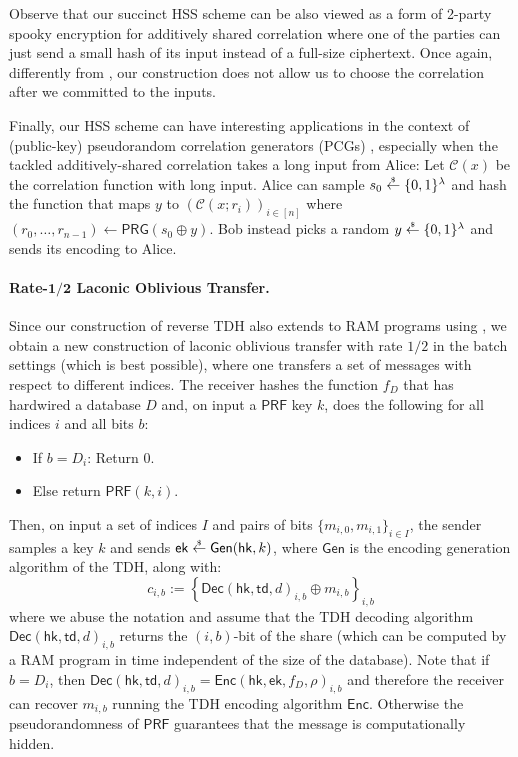 \documentclass{article}
\newcommand{\ek}{\mathsf{ek}}
\newcommand{\td}{\mathsf{td}}
\newcommand{\getsr}{\overset{\raisebox{-1pt}{$\scriptscriptstyle \$$}}{\gets}}
\newcommand{\sample}{\getsr}
\renewcommand{\sec}{\ensuremath{\lambda}}
\newcommand{\algofont}[1]{\ensuremath{\mathsf{#1}}}
\newcommand{\Enc}{{\algofont{Enc}}}
\newcommand{\Dec}{{\algofont{Dec}}}
\newcommand{\Gen}{{\algofont{Gen}}}
\newcommand{\hk}{\ensuremath{\mathsf{hk}}}
\begin{document}
Observe that our succinct HSS scheme can be also viewed as a form of 2-party spooky encryption for additively shared correlation \cite{C:DHRW16} where one of the parties can just send a small hash of its input instead of a full-size ciphertext. Once again, differently from \cite{C:DHRW16}, our construction does not allow us to choose the correlation after we committed to the inputs.

Finally, our HSS scheme can have interesting applications in the context of (public-key) pseudorandom correlation generators (PCGs) \cite{C:BCGIKS19,EC:OrlSchYak21,EC:AbrSchYak22}, especially when the tackled additively-shared correlation takes a long input from Alice: Let $\mathcal{C}(x)$ be the correlation function with long input. Alice can sample $s_0\sample\{0, 1\}^\sec$ and hash the function that maps $y$ to $(\mathcal{C}(x; r_i))_{i\in[n]}$ where $(r_0, \dots, r_{n-1})\gets \mathsf{PRG}(s_0\oplus y)$. Bob instead picks a random $y\sample\{0, 1\}^\sec$ and sends its encoding to Alice.



\paragraph{Rate-$\mathbf{1/2}$ Laconic Oblivious Transfer.} Since our construction of reverse TDH also extends to RAM programs using \cite{C:DHMWW24}, we obtain a new construction of laconic oblivious transfer \cite{C:CDGGMP17} with rate $1/2$ in the batch settings (which is best possible), where one transfers a set of messages with respect to different indices. The receiver hashes the function $f_D$ that has hardwired a database $D$ and, on input a $\mathsf{PRF}$ key $k$, does the following for all indices $i$ and all bits $b$:
\begin{itemize}
    \item If $b = D_i$: Return $0$.
    \item Else return $\mathsf{PRF}(k, i)$.
\end{itemize}
Then, on input a set of indices $I$ and pairs of bits $\{m_{i,0}, m_{i,1}\}_{i\in I}$, the sender
samples a key $k$ and sends $\ek \sample \Gen(\hk, k)$, where $\Gen$ is the encoding generation algorithm of the TDH, along with:
\[
c_{i,b} := \left\{\Dec(\hk, \td, d)_{i,b} \oplus m_{i,b}\right\}_{i,b}
\]
where we abuse the notation and assume that the TDH decoding algorithm $\Dec(\hk, \td, d)_{i,b}$ returns the $(i,b)$-bit of the share (which can be computed by a RAM program in time independent of the size of the database). Note that if $b = D_i$, then $\Dec(\hk, \td, d)_{i,b} = \Enc(\hk, \ek, f_D, \rho)_{i,b}$ and therefore the receiver can recover $m_{i,b}$ running the TDH encoding algorithm $\Enc$. Otherwise the pseudorandomness of $\mathsf{PRF}$ guarantees that the message is computationally hidden.
\end{document}
